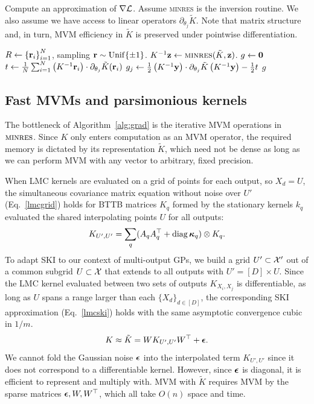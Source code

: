 \documentclass[twoside]{article}
\begin{document}
\begin{algorithm}[!ht]
  \caption{Compute an approximation of $\nabla \mathcal{L}$. Assume \textsc{minres} is the inversion routine. We also assume we have access to linear operators $\partial_{\theta_j}\tilde{K}$. Note that matrix structure and, in turn, MVM efficiency in $\tilde{K}$ is preserved under pointwise differentiation.} \label{alg:grad}
\begin{algorithmic}[1]
  \State $R\gets\left\{ {\textbf{r}}_i \right\}_{ i=1 }^{ N }$, sampling ${\textbf{r}}\sim\operatorname{Unif}\{\pm 1\}$.
\State $K^{-1}\textbf{z}\gets\textsc{minres}(\tilde{K},\textbf{z})$.
\EndFor
\State $g\gets \textbf{0}$
\State $t\gets \frac{1}{N}\sum_{i=1}^{N}\left({K^{-1}{\textbf{r}}_i}\right)\cdot \partial_{\theta_j}\tilde{K}({\textbf{r}}_i)$
\State $g_j\gets \frac{1}{2}\left({K^{-1}\textbf{y}}\right)\cdot\partial_{\theta_j} \tilde{K}\left({K^{-1}\textbf{y}}\right)-\frac{1}{2}t$
\EndFor
\State \Return $g$ 
\EndProcedure
\end{algorithmic}
\end{algorithm}

\subsection{Fast MVMs and parsimonious kernels}\label{fast-mvm}

The bottleneck of Algorithm~\ref{alg:grad} is the iterative MVM operations in $\textsc{minres}$. Since $K$ only enters computation as an MVM operator, the required memory is dictated by its representation $\tilde{K}$, which need not be dense as long as we can perform MVM with any vector to arbitrary, fixed precision.

When LMC kernels are evaluated on a grid of points for each output, so $X_d=U$, the simultaneous covariance matrix equation without noise over ${U'}$  (Eq.~\ref{lmcgrid}) holds for BTTB matrices $K_q$ formed by the stationary kernels $k_q$ evaluated the shared interpolating points $U$ for all outputs:
\begin{align}
  K_{{U'},{U'}}=\sum_q(A_qA_q^\top+\operatorname{diag}{\boldsymbol\kappa}_q)\otimes K_q\label{lmcgrid}.
\end{align}
To adapt SKI to our context of multi-output GPs, we build a grid ${U'}\subset\mathcal{X}'$ out of a common subgrid $U\subset\mathcal{X}$ that extends to all outputs with ${U'} = [D]\times U$. Since the LMC kernel evaluated between two sets of outputs $K_{X_i,X_j}$ is differentiable, as long as $U$ spans a range larger than each $\{X_d\}_{d\in[D]}$, the corresponding SKI approximation (Eq.~\ref{lmcski}) holds with the same asymptotic convergence cubic in $1/m$.
\begin{align}
  K\approx \tilde{K}=WK_{{U'},{U'}}W^\top+{\boldsymbol\epsilon}.\label{lmcski}
\end{align}
We cannot fold the Gaussian noise ${\boldsymbol\epsilon}$ into the interpolated term $K_{{U'},{U'}}$ since it does not correspond to a differentiable kernel. However, since ${\boldsymbol\epsilon}$ is diagonal, it is efficient to represent and multiply with. MVM with $\tilde{K}$ requires MVM by the sparse matrices ${\boldsymbol\epsilon}, W,W^\top$, which all take $O(n)$ space and time.
\end{document}
